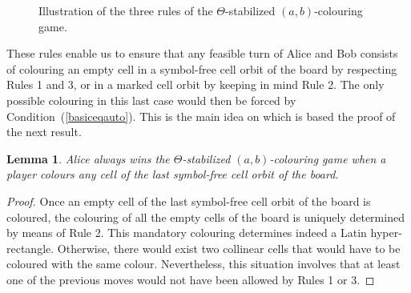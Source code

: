 \documentclass{article}
\newtheorem{lem}[thm]{Lemma}
\begin{document}
\begin{figure}[htbp]
\begin{center}
\end{center}
\caption{\label{rulefigure}Illustration of the three rules of the $\Theta$-stabilized $(a,b)$-colouring game.}
\end{figure}

 These rules enable us to ensure that any feasible turn of Alice and Bob consists of colouring an empty cell in a symbol-free cell orbit of the board by respecting Rules 1 and 3, or in a marked cell orbit by keeping in 
 mind Rule 2. The only possible colouring in this last case would then be forced by Condition~(\ref{basiceqauto}). This is the main idea on which is based the proof of the next result.

\begin{lem}\label{lem_AliceWins} Alice always wins the $\Theta$-stabilized $(a,b)$-colouring game when a player colours any cell of the last symbol-free cell orbit of the board.
\end{lem}

\begin{proof} Once an empty cell of the last symbol-free cell orbit of the board is coloured, the colouring of all the empty cells of the board is uniquely determined by means of Rule 2. This mandatory colouring determines indeed a Latin hyper-rectangle. Otherwise, there would exist two collinear cells that would have to be coloured with the same colour. Nevertheless, this situation involves that at least one of the previous moves would not have been allowed by Rules 1 or 3.
\end{proof}

\vspace{0.4cm}
\end{document}
